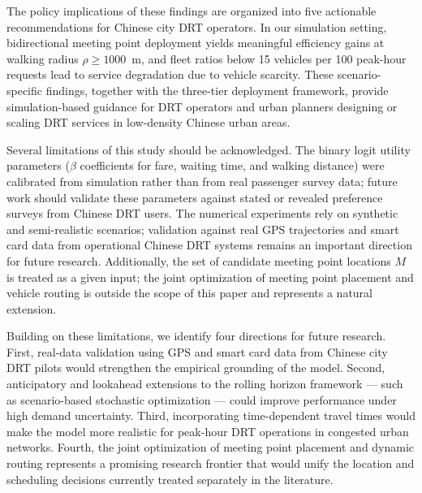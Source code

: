 The policy implications of these findings are organized into five actionable
recommendations for Chinese city DRT operators.
In our simulation setting, bidirectional meeting point deployment yields meaningful
efficiency gains at walking radius $\rho \geq 1000$~m, and fleet ratios below
15 vehicles per 100 peak-hour requests lead to service degradation due to vehicle
scarcity. These scenario-specific findings, together with the three-tier deployment
framework, provide simulation-based guidance for DRT operators and urban
planners designing or scaling DRT services in low-density Chinese urban areas.

Several limitations of this study should be acknowledged.
The binary logit utility parameters ($\beta$ coefficients for fare, waiting time, and walking
distance) were calibrated from simulation rather than from real passenger survey data;
future work should validate these parameters against stated or revealed preference surveys
from Chinese DRT users.
The numerical experiments rely on synthetic and semi-realistic scenarios; validation
against real GPS trajectories and smart card data from operational Chinese DRT systems
remains an important direction for future research.
Additionally, the set of candidate meeting point locations $M$ is treated as a given
input; the joint optimization of meeting point placement and vehicle routing is outside
the scope of this paper and represents a natural extension.

Building on these limitations, we identify four directions for future research.
First, real-data validation using GPS and smart card data from Chinese city DRT pilots
would strengthen the empirical grounding of the model.
Second, anticipatory and lookahead extensions to the rolling horizon framework — such as
scenario-based stochastic optimization \citep{bent2004} — could improve performance
under high demand uncertainty.
Third, incorporating time-dependent travel times would make the model more realistic for
peak-hour DRT operations in congested urban networks.
Fourth, the joint optimization of meeting point placement and dynamic routing represents
a promising research frontier that would unify the location and scheduling decisions
currently treated separately in the literature.
